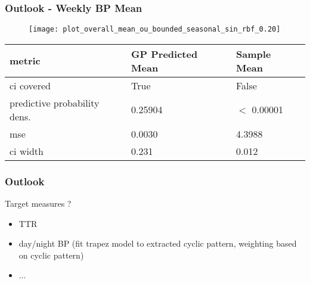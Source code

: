 \documentclass[
	8pt, %
]{beamer}
\begin{document}
\begin{frame}
	\frametitle{Outlook - Weekly BP Mean}
	\begin{figure}
		\texttt{[image: plot\_overall\_mean\_ou\_bounded\_seasonal\_sin\_rbf\_0.20]}
	\end{figure}


	\begin{table}
		\begin{tabular}{l l l}
			\toprule
			\textbf{metric} & \textbf{GP Predicted Mean} & \textbf{Sample Mean}\\
			\midrule
			ci covered & True & False \\
			predictive probability dens. & 0.25904 & $<$ 0.00001 \\
			mse & 0.0030 & 4.3988 \\
			ci width &  0.231 & 0.012 \\
			\bottomrule
		\end{tabular}


	\end{table}


\end{frame}


\begin{frame}
	\frametitle{Outlook}

	Target measures ?
	\begin{itemize}
		\item TTR
		\item day/night BP (fit trapez model to extracted cyclic pattern, weighting based on cyclic pattern)
		\item $\dots$
	\end{itemize}

\end{frame}
\end{document}
